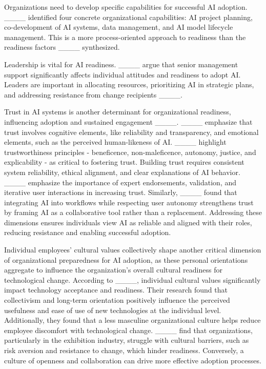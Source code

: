 Organizations need to develop specific capabilities for successful AI adoption. ____ identified four concrete organizational capabilities: AI project planning, co-development of AI systems, data management, and AI model lifecycle management. This is a more process-oriented approach to readiness than the readiness factors ____ synthesized.

Leadership is vital for AI readiness. ____ argue that senior management support significantly affects individual attitudes and readiness to adopt AI. Leaders are important in allocating resources, prioritizing AI in strategic plans, and addressing resistance from change recipients ____.

Trust in AI systems is another determinant for organizational readiness, influencing adoption and sustained engagement ____. ____ emphasize that trust involves cognitive elements, like reliability and transparency, and emotional elements, such as the perceived human-likeness of AI. ____ highlight trustworthiness principles - beneficence, non-maleficence, autonomy, justice, and explicability - as critical to fostering trust. Building trust requires consistent system reliability, ethical alignment, and clear explanations of AI behavior. ____ emphasize the importance of expert endorsements, validation, and iterative user interactions in increasing trust. Similarly, ____ found that integrating AI into workflows while respecting user autonomy strengthens trust by framing AI as a collaborative tool rather than a replacement. Addressing these dimensions ensures individuals view AI as reliable and aligned with their roles, reducing resistance and enabling successful adoption.

Individual employees' cultural values collectively shape another critical dimension of organizational preparedness for AI adoption, as these personal orientations aggregate to influence the organization's overall cultural readiness for technological change. According to ____, individual cultural values significantly impact technology acceptance and readiness. Their research found that collectivism and long-term orientation positively influence the perceived usefulness and ease of use of new technologies at the individual level. Additionally, they found that a less masculine organizational culture helps reduce employee discomfort with technological change. ____ find that organizations, particularly in the exhibition industry, struggle with cultural barriers, such as risk aversion and resistance to change, which hinder readiness. Conversely, a culture of openness and collaboration can drive more effective adoption processes.

